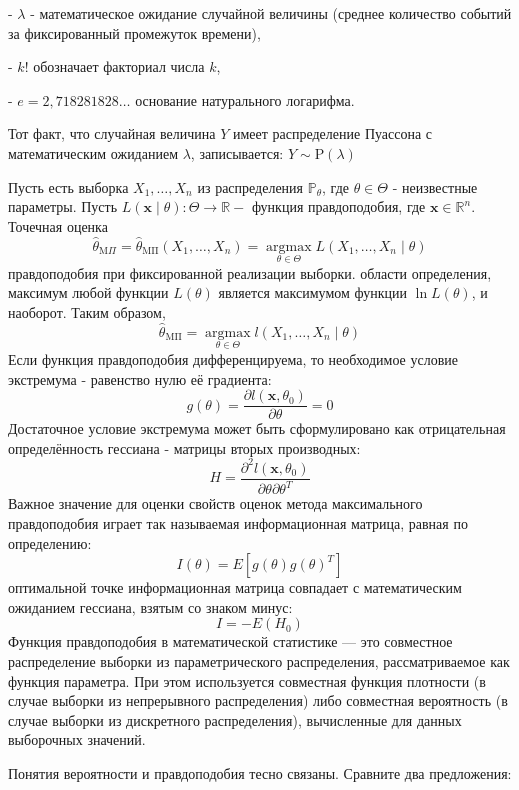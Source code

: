 \documentclass[a4paper, 12pt]{article}
\begin{document}
	- $\lambda$ - математическое ожидание случайной величины (среднее количество событий за фиксированный промежуток времени),
	
	- $k !$ обозначает факториал числа $k$,
	
	- $e=2,718281828 \ldots$ основание натурального логарифма.
	
	Тот факт, что случайная величина $Y$ имеет распределение Пуассона с математическим ожиданием $\lambda$, записывается:
	$Y \sim \mathrm{P}(\lambda)$
	

	Пусть есть выборка $X_{1}, \ldots, X_{n}$ из распределения $\mathbb{P}_{\theta}$, где $\theta \in \Theta$ - неизвестные параметры. Пусть $L(\mathbf{x} \mid \theta): \Theta \rightarrow \mathbb{R}-$ функция правдоподобия, где $\mathbf{x} \in \mathbb{R}^{n}$. Точечная оценка $$\hat{\theta}_{\mathrm{M} \Pi}=\hat{\theta}_{\mathrm{M\Pi}}\left(X_{1}, \ldots, X_{n}\right)=\underset{\theta \in \Theta}{\operatorname{argmax}} L\left(X_{1}, \ldots, X_{n} \mid \theta\right)$$
	правдоподобия при фиксированной реализации выборки.
	области определения, максимум любой функции $L(\theta)$ является максимумом функции $\ln L(\theta)$, и наоборот. Таким образом, $$\hat{\theta}_{\mathrm{M\Pi}}=\underset{\theta \in \Theta}{\operatorname{argmax}} l\left(X_{1}, \ldots, X_{n} \mid \theta\right)$$
	Если функция правдоподобия дифференцируема, то необходимое условие экстремума - равенство нулю её градиента:
	$$g(\theta)=\frac{\partial l\left(\mathbf{x}, \theta_{0}\right)}{\partial \theta}=0$$
	Достаточное условие экстремума может быть сформулировано как отрицательная определённость гессиана - матрицы вторых производных:
	$$H=\frac{\partial^{2} l\left(\mathbf{x}, \theta_{0}\right)}{\partial \theta \partial \theta^{T}}$$
	Важное значение для оценки свойств оценок метода максимального правдоподобия играет так называемая информационная матрица, равная по определению:
	$$I(\theta)=E\left[g(\theta) g(\theta)^{T}\right]$$
	оптимальной точке информационная матрица совпадает с математическим ожиданием гессиана, взятым со знаком минус:
	$$I=-E\left(H_{0}\right)$$
	Функция правдоподобия в математической статистике — это совместное распределение выборки из параметрического распределения, рассматриваемое как функция параметра. При этом используется совместная функция плотности (в случае выборки из непрерывного распределения) либо совместная вероятность (в случае выборки из дискретного распределения), вычисленные для данных выборочных значений.
	
	Понятия вероятности и правдоподобия тесно связаны. Сравните два предложения:
	
\end{document}
